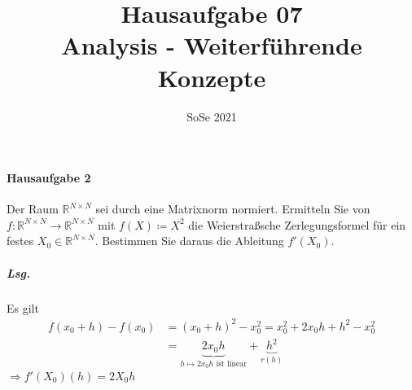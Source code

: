 \documentclass{scrreprt}
\author{}
\date{SoSe 2021}
\title{Hausaufgabe 07 \\Analysis - Weiterführende Konzepte}
\begin{document}
\paragraph{Hausaufgabe 2} Der Raum $\mathbb{R}^{N \times N}$ sei durch eine
Matrixnorm normiert.
Ermitteln Sie von $f \colon \mathbb{R}^{N \times N} \to \mathbb{R}^{N \times N}$
mit $f(X) \coloneqq X^2$ die Weierstraßsche Zerlegungsformel für ein festes
$X_0 \in \mathbb{R}^{N \times N}$.
Bestimmen Sie daraus die Ableitung $f'(X_0)$.

\subparagraph{Lsg.}

Es gilt
\begin{align*}
  f(x_0 + h) - f(x_0) &= (x_0 + h)^2 - x_0^2 = x_0^2 + 2x_0h + h^2 - x_0^2 \\
                      &= \underset{h \mapsto 2x_0h \text{ ist linear}}{\underbrace{2x_0h}} +
                        \underset{r(h)}{\underbrace{h^2}}
\end{align*}
$\Rightarrow f'(X_0)(h) = 2X_0h$
\end{document}
